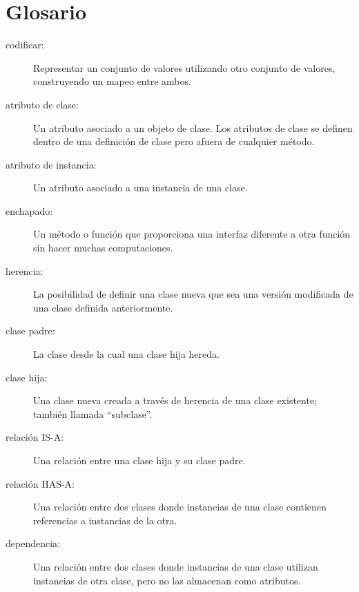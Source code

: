 \documentclass[10pt]{book}
\begin{document}
\section{Glosario}

\begin{description}

\item[codificar:]  Representar un conjunto de valores utilizando otro
conjunto de valores, construyendo un mapeo entre ambos.

\item[atributo de clase:] Un atributo asociado a un objeto
de clase.  Los atributos de clase se definen dentro de una
definición de clase pero afuera de cualquier método.

\item[atributo de instancia:] Un atributo asociado a
una instancia de una clase.

\item[enchapado:] Un método o función que proporciona una interfaz
diferente a otra función sin hacer muchas computaciones.

\item[herencia:] La posibilidad de definir una clase nueva que sea una
versión modificada de una clase definida anteriormente.

\item[clase padre:] La clase desde la cual una clase hija hereda.

\item[clase hija:] Una clase nueva creada a través de herencia de una
clase existente; también llamada ``subclase''.

\item[relación IS-A:] Una relación entre una clase hija
y su clase padre.

\item[relación HAS-A:] Una relación entre dos clases
donde instancias de una clase contienen referencias a instancias de
la otra.

\item[dependencia:] Una relación entre dos clases
donde instancias de una clase utilizan instancias de otra clase,
pero no las almacenan como atributos.


\end{description}
\end{document}
